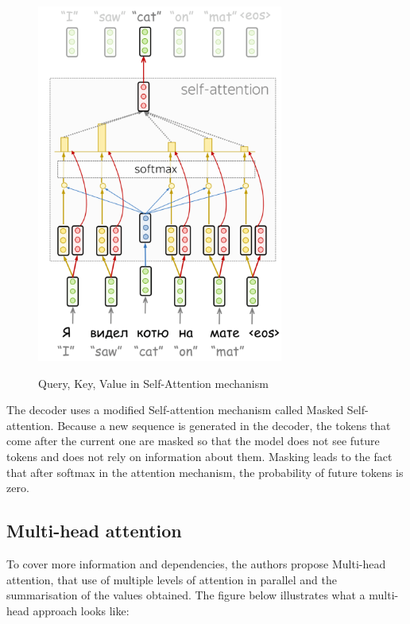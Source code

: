 \documentclass[PMI,VKR]{HSEUniversity}
\begin{document}
\begin{figure}[h]
    \centering
    \includegraphics[scale=1]{img/query-key-value.png}
    \caption{Query, Key, Value in Self-Attention mechanism}
\end{figure}

The decoder uses a modified Self-attention mechanism called Masked Self-attention. Because a new sequence is generated in the decoder, the tokens that come after the current one are masked so that the model does not see future tokens and does not rely on information about them. 
Masking leads to the fact that after softmax in the attention mechanism, the probability of future tokens is zero.

\subsection{Multi-head attention}

To cover more information and dependencies, the authors propose Multi-head attention, that use of multiple levels of attention in parallel and the summarisation of the values obtained. 
The figure below illustrates what a multi-head approach looks like:
\end{document}

